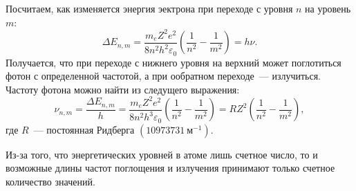 Посчитаем, как изменяется энергия эектрона при переходе с уровня $n$ на уровень $m$:
\begin{equation}
	\Delta E_{n, m} = \frac{m_e Z^2 e^2}{8 n^2 h^2 \varepsilon_0} \left( \frac{1}{n^2} - \frac{1}{m^2}\right) = h \nu.
\end{equation}
Получается, что при переходе с нижнего уровня на верхний может поглотиться фотон с определенной частотой, а при ообратном переходе~--- излучиться. Частоту фотона можно найти из следущего выражения:
\begin{equation}
	\nu_{n, m} =
	\frac{\Delta E_{n, m}}{h} = \frac{m_e Z^2 e^2}{8 n^2 h^3 \varepsilon_0} \left( \frac{1}{n^2} - \frac{1}{m^2}\right) = R Z^2 \left(\frac{1}{n^2} - \frac{1}{m^2} \right),
\end{equation}
где $R$~--- постоянная Ридберга $(10973731~\text{м}^{-1})$.

Из-за того, что энергетических уровней в атоме лишь счетное число, то и возможные длины частот поглощения и излучения принимают только счетное количество значений.
